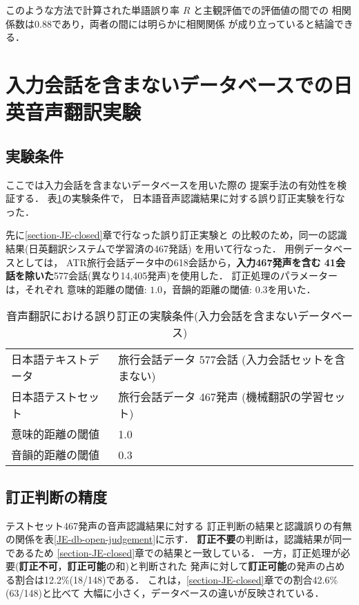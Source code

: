 このような方法で計算された単語誤り率 $R$ と主観評価での評価値の間での
相関係数は0.88であり，両者の間には明らかに相関関係
が成り立っていると結論できる．



\section{入力会話を含まないデータベースでの日英音声翻訳実験}
\label{section-JE-db-open}

\subsection{実験条件}

ここでは入力会話を含まないデータベースを用いた際の
提案手法の有効性を検証する．
表\ref{JE-db-open-condition}の実験条件で，
日本語音声認識結果に対する誤り訂正実験を行なった．

先に\ref{section-JE-closed}章で行なった誤り訂正実験と
の比較のため，同一の認識結果(日英翻訳システムで学習済の467発話)
を用いて行なった．
用例データベースとしては，
ATR旅行会話データ中の618会話から，{\bf 入力467発声を含む
41会話を除いた}577会話(異なり14,405発声)を使用した．
訂正処理のパラメーターは，それぞれ
意味的距離の閾値: $1.0$，音韻的距離の閾値: $0.3$を用いた．

\begin{table}
\begin{center}
\caption{音声翻訳における誤り訂正の実験条件(入力会話を含まないデータベース)}
\label{JE-db-open-condition}
\begin{tabular}{|ll|}
\hline
日本語テキストデータ & 旅行会話データ 577会話 (入力会話セットを含まない) \\
日本語テストセット & 旅行会話データ 467発声 (機械翻訳の学習セット) \\
意味的距離の閾値 & 1.0 \\
音韻的距離の閾値 & 0.3 \\ \hline
\end{tabular}
\end{center}
\end{table}


\subsection{訂正判断の精度}

テストセット467発声の音声認識結果に対する
訂正判断の結果と認識誤りの有無の関係を表\ref{JE-db-open-judgement}に示す．
{\bf 訂正不要}の判断は，認識結果が同一であるため
\ref{section-JE-closed}章での結果と一致している．
一方，訂正処理が必要({\bf 訂正不可}，{\bf 訂正可能}の和)と判断された
発声に対して{\bf 訂正可能}の発声の占める割合は12.2\%(18/148)である．
これは，\ref{section-JE-closed}章での割合42.6\%(63/148)と比べて
大幅に小さく，データベースの違いが反映されている．

